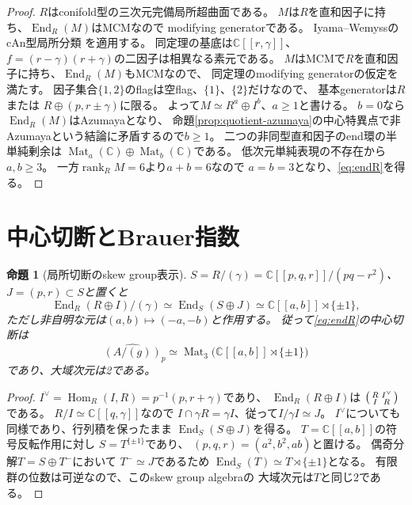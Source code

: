 \documentclass[11pt,a4paper]{ltjsarticle}
\newtheorem{proposition}[theorem]{命題}
\newcommand{\CC}{\mathbb C}
\newcommand{\End}{\operatorname{End}}
\newcommand{\Hom}{\operatorname{Hom}}
\newcommand{\Mat}{\operatorname{Mat}}
\begin{document}
\begin{proof}
$R$はconifold型の三次元完備局所超曲面である。
$M$は$R$を直和因子に持ち、$\End_R(M)$はMCMなので
modifying generatorである。
Iyama--WemyssのcAn型局所分類
\cite[Theorem~5.1(1)]{IW}を適用する。
同定理の基底は$\CC[[r,\gamma]]$、
$f=(r-\gamma)(r+\gamma)$の二因子は相異なる素元である。
$M$はMCMで$R$を直和因子に持ち、$\End_R(M)$もMCMなので、
同定理のmodifying generatorの仮定を満たす。
因子集合$\{1,2\}$のflagは空flag、$\{1\}$、$\{2\}$だけなので、
基本generatorは$R$または
$R\oplus(p,r\pm\gamma)$に限る。
よって$M\simeq R^a\oplus I^b$、$a\ge1$と書ける。
$b=0$なら$\End_R(M)$はAzumayaとなり、
命題\ref{prop:quotient-azumaya}の中心特異点で非Azumayaという結論に矛盾するので$b\ge1$。
二つの非同型直和因子のend環の半単純剰余は
$\Mat_a(\CC)\oplus\Mat_b(\CC)$である。
低次元単純表現の不存在から$a,b\ge3$。
一方$\operatorname{rank}_R M=6$より$a+b=6$なので
$a=b=3$となり、\eqref{eq:endR}を得る。
\end{proof}

\section{中心切断とBrauer指数}
\begin{proposition}[局所切断のskew group表示]\label{prop:skew}
$S=R/(\gamma)=\CC[[p,q,r]]/(pq-r^2)$、
$J=(p,r)\subset S$と置くと
\[
 \End_R(R\oplus I)/(\gamma)
 \simeq\End_S(S\oplus J)
 \simeq\CC[[a,b]]\rtimes\{\pm1\},
\]
ただし非自明な元は$(a,b)\mapsto(-a,-b)$と作用する。
従って\eqref{eq:endR}の中心切断は
\[
 \widehat{(A/(g))}_{p}\simeq
 \Mat_3\bigl(\CC[[a,b]]\rtimes\{\pm1\}\bigr)
\]
であり、大域次元は2である。
\end{proposition}
\begin{proof}
$I^\vee=\Hom_R(I,R)=p^{-1}(p,r+\gamma)$であり、
$\End_R(R\oplus I)$は
$\begin{psmallmatrix}R&I^\vee\\ I&R\end{psmallmatrix}$である。
$R/I\simeq\CC[[q,\gamma]]$なので
$I\cap\gamma R=\gamma I$、従って$I/\gamma I\simeq J$。
$I^\vee$についても同様であり、行列積を保ったまま
$\End_S(S\oplus J)$を得る。
$T=\CC[[a,b]]$の符号反転作用に対し
$S=T^{\{\pm1\}}$であり、
$(p,q,r)=(a^2,b^2,ab)$と置ける。
偶奇分解$T=S\oplus T^{-}$において
$T^{-}\simeq J$であるため
$\End_S(T)\simeq T\rtimes\{\pm1\}$となる。
有限群の位数は可逆なので、このskew group algebraの
大域次元は$T$と同じ2である。
\end{proof}
\end{document}
